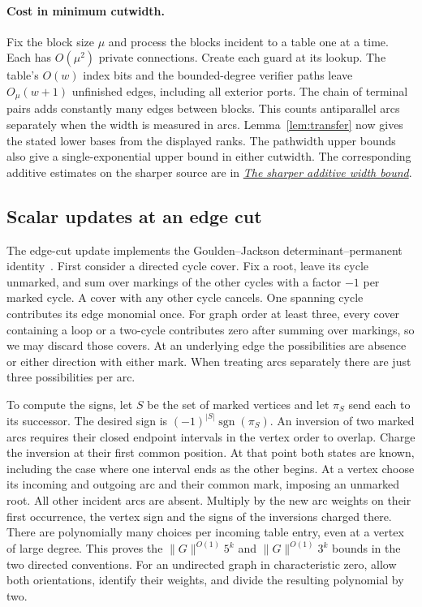 \documentclass[11pt]{article}
\theoremstyle{definition}
\begin{document}
\paragraph{Cost in minimum cutwidth.}
Fix the block size \(\mu\) and process the blocks incident to a table one at a time. Each has \(O(\mu^2)\) private connections. Create each guard at its lookup. The table's \(O(w)\) index bits and the bounded-degree verifier paths leave \(O_\mu(w+1)\) unfinished edges, including all exterior ports. The chain of terminal pairs adds constantly many edges between blocks. This counts antiparallel arcs separately when the width is measured in arcs. Lemma~\ref{lem:transfer} now gives the stated lower bases from the displayed ranks. The pathwidth upper bounds also give a single-exponential upper bound in either cutwidth. The corresponding additive estimates on the sharper source are in \href{sharper-additive-bound.md}{\emph{The sharper additive width bound}}.

\subsection{Scalar updates at an edge cut}\label{sec:cut-upper}

The edge-cut update implements the Goulden--Jackson determinant--permanent identity~\cite[Theorem~4.1]{goulden-jackson}. First consider a directed cycle cover. Fix a root, leave its cycle unmarked, and sum over markings of the other cycles with a factor \(-1\) per marked cycle. A cover with any other cycle cancels. One spanning cycle contributes its edge monomial once. For graph order at least three, every cover containing a loop or a two-cycle contributes zero after summing over markings, so we may discard those covers. At an underlying edge the possibilities are absence or either direction with either mark. When treating arcs separately there are just three possibilities per arc.

To compute the signs, let \(S\) be the set of marked vertices and let \(\pi_S\) send each to its successor. The desired sign is \((-1)^{|S|}\operatorname{sgn}(\pi_S)\). An inversion of two marked arcs requires their closed endpoint intervals in the vertex order to overlap. Charge the inversion at their first common position. At that point both states are known, including the case where one interval ends as the other begins. At a vertex choose its incoming and outgoing arc and their common mark, imposing an unmarked root. All other incident arcs are absent. Multiply by the new arc weights on their first occurrence, the vertex sign and the signs of the inversions charged there. There are polynomially many choices per incoming table entry, even at a vertex of large degree. This proves the \(\|G\|^{O(1)}5^k\) and \(\|G\|^{O(1)}3^k\) bounds in the two directed conventions. For an undirected graph in characteristic zero, allow both orientations, identify their weights, and divide the resulting polynomial by two.
\end{document}
